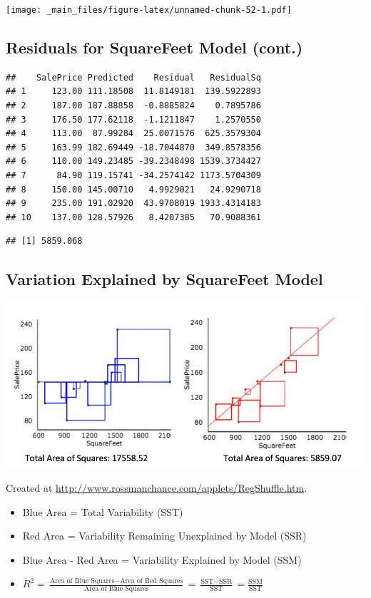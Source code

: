 \documentclass[]{book}
\newenvironment{Shaded}{\begin{snugshade}}{\end{snugshade}}
\newcommand{\KeywordTok}[1]{\textcolor[rgb]{0.13,0.29,0.53}{\textbf{#1}}}
\newcommand{\DecValTok}[1]{\textcolor[rgb]{0.00,0.00,0.81}{#1}}
\newcommand{\OperatorTok}[1]{\textcolor[rgb]{0.81,0.36,0.00}{\textbf{#1}}}
\newcommand{\NormalTok}[1]{#1}
\begin{document}
\texttt{[image: \_main\_files/figure-latex/unnamed-chunk-52-1.pdf]}

\subsection{Residuals for SquareFeet Model
(cont.)}\label{residuals-for-squarefeet-model-cont.}

\begin{verbatim}
##    SalePrice Predicted    Residual   ResidualSq
## 1     123.00 111.18508  11.8149181  139.5922893
## 2     187.00 187.88858  -0.8885824    0.7895786
## 3     176.50 177.62118  -1.1211847    1.2570550
## 4     113.00  87.99284  25.0071576  625.3579304
## 5     163.99 182.69449 -18.7044870  349.8578356
## 6     110.00 149.23485 -39.2348498 1539.3734427
## 7      84.90 119.15741 -34.2574142 1173.5704309
## 8     150.00 145.00710   4.9929021   24.9290718
## 9     235.00 191.02920  43.9708019 1933.4314183
## 10    137.00 128.57926   8.4207385   70.9088361
\end{verbatim}

\begin{Shaded}
\end{Shaded}

\begin{verbatim}
## [1] 5859.068
\end{verbatim}

\subsection{Variation Explained by SquareFeet
Model}\label{variation-explained-by-squarefeet-model}

\includegraphics[width=0.65\linewidth]{Rsq}

Created at \url{http://www.rossmanchance.com/applets/RegShuffle.htm}.

\begin{itemize}
\item
  Blue Area = Total Variability (SST)
\item
  Red Area = Variability Remaining Unexplained by Model (SSR)
\item
  Blue Area - Red Area = Variability Explained by Model (SSM)
\item
  \(R^2 = \frac{\text{Area of Blue Squares} - \text{Area of Red Squares}}{\text{Area of Blue Squares}} = \frac{\text{SST}-\text{SSR}}{\text{SST}}= \frac{\text{SSM}}{\text{SST}}\)
\end{itemize}
\end{document}
